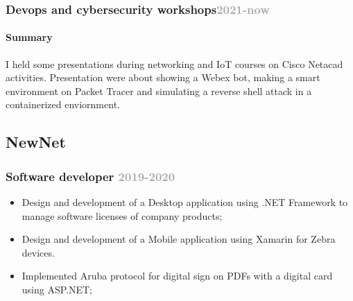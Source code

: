 \documentclass[11pt,a4paper]{article}
\begin{document}
\subsubsection{Devops and cybersecurity workshops\hfill \textcolor{darkgray}{\small{2021-now}}}

\paragraph{Summary}I held some presentations during networking and IoT courses on Cisco Netacad activities. Presentation were about showing a Webex bot, making a smart environment on Packet Tracer and simulating a reverse shell attack in a containerized enviornment.
\subsection{NewNet}
\subsubsection{Software developer \hfill \textcolor{darkgray}{\small{2019-2020}}}
\begin{itemize}
  \item Design and development of a Desktop application using .NET Framework to manage software licenses of company products;
  \item Design and development of a Mobile application using Xamarin for Zebra devices.
  \item Implemented Aruba protocol for digital sign on PDFs with a digital card using ASP.NET;
\end{itemize}
%
%
\end{document}
